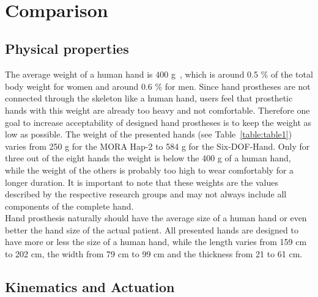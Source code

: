 \documentclass[a4paper, 10pt, conference]{ieeeconf}      %
\begin{document}
\newpage~\newpage

\section{Comparison}

\subsection{Physical properties}

The average weight of a human hand is 400 g~\cite{humanbody}, which is around 0.5 $\%$ of the total body weight for women and around 0.6 $\%$ for men. Since hand prostheses are not connected through the skeleton like a human hand, users feel that prosthetic hands with this weight are already too heavy and not comfortable. Therefore one goal to increase acceptability of designed hand prostheses is to keep the weight as low as possible. The weight of the presented hands (see Table~\ref{table:table1}) varies from 250 g for the MORA Hap-2 to 584 g for the Six-DOF-Hand. Only for three out of the eight hands the weight is below the 400 g of a human hand, while the weight of the others is probably too high to wear comfortably for a longer duration. It is important to note that these weights are the values described by the respective research groups and may not always include all components of the complete hand.\\
Hand prosthesis naturally should have the average size of a human hand or even better the hand size of the actual patient. All presented hands are designed to have more or less the size of a human hand, while the length varies from 159 cm to 202 cm, the width from 79 cm to 99 cm and the thickness from 21 to 61 cm.

\subsection{Kinematics and Actuation}
\end{document}
